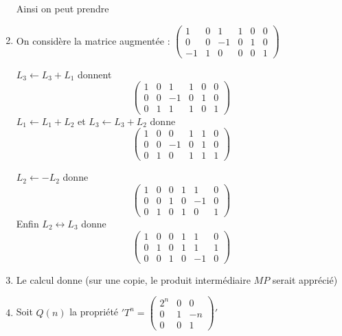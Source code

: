 \documentclass[a4paper, 11pt,reqno]{article}
\begin{document}
\begin{correction}
\begin{enumerate}
Ainsi on peut prendre 

\item  On considère la matrice augmentée : 
$\left(\begin{array}{ccc|ccc}  
1&0&1 & 1&0&0 \\
0&0&-1& 0&1&0 \\
-1&1&0& 0&0&1 
\end{array}\right)$

$L_3\leftarrow L_3+L_1$  donnent
$$\left(\begin{array}{ccc|ccc}  
1&0&1 & 1&0&0 \\
0&0&-1& 0&1&0 \\
0&1&1& 1&0&1 
\end{array}\right)$$
$L_1\leftarrow L_1+L_2$ et $L_3\leftarrow L_3+L_2$
donne 
$$\left(\begin{array}{ccc|ccc}  
1&0&0 & 1&1&0 \\
0&0&-1& 0&1&0 \\
0&1&0& 1&1&1 
\end{array}\right)$$

$L_2\leftarrow -L_2$
donne 
$$\left(\begin{array}{ccc|ccc}  
1&0&0 & 1&1&0 \\
0&0&1& 0&-1&0 \\
0&1&0& 1&0&1 
\end{array}\right)$$
Enfin 
$L_2\leftrightarrow L_3$
donne 
$$\left(\begin{array}{ccc|ccc}  
1&0&0 & 1&1&0 \\
0&1&0& 1&1&1 \\
0&0&1& 0&-1&0 
\end{array}\right)$$


\item Le calcul donne  
(sur une copie, le produit intermédiaire $MP$ serait apprécié)

\item
Soit $Q(n) $ la propriété $'T^n=\left(\begin{array}{ccc}  
2^n&0&0 \\
0 &1&-n \\
0&0&1 
\end{array}\right)'$


\end{enumerate}
\end{correction}
\end{document}

